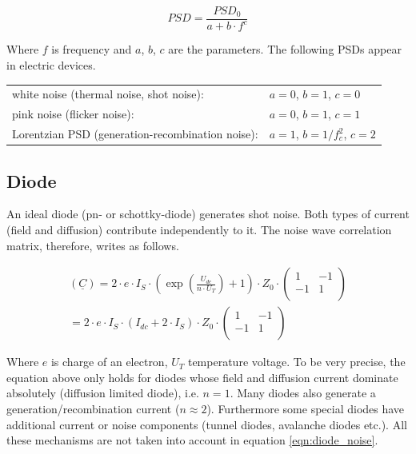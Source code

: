 \documentclass[10pt]{report}
\begin{document}
\begin{equation}
PSD = \frac{PSD_0}{a+b\cdot f^c}
\end{equation}

Where $f$ is frequency and $a$, $b$, $c$ are the parameters.  The
following PSDs appear in electric devices.

\addvspace{12pt}

\begin{tabular}{ll}
white noise (thermal noise, shot noise):         & $a=0$, $b=1$, $c=0$ \\
pink noise (flicker noise):                      & $a=0$, $b=1$, $c=1$ \\
Lorentzian PSD (generation-recombination noise): & $a=1$, $b=1/f_c^2$, $c=2$ \\
\end{tabular}


\subsection{Diode}

An ideal diode (pn- or schottky-diode) generates shot noise. Both types of current
(field and diffusion) contribute independently to it. The noise wave correlation
matrix, therefore, writes as follows.

\begin{equation}
\begin{split}
(\underline{C})
 = 2\cdot e\cdot I_S\cdot \left( \exp\left( \frac{U_{dc}}{n\cdot U_T} \right) +1 \right) \cdot Z_0\cdot\begin{pmatrix}
   1 & -1\\
  -1 &  1\\
\end{pmatrix} \\
 = 2\cdot e\cdot I_S\cdot (I_{dc}+2\cdot I_S)\cdot Z_0\cdot
\begin{pmatrix}
   1 & -1\\
  -1 &  1\\
\end{pmatrix}
\end{split}
\label{eqn:diode_noise}
\end{equation}

Where $e$ is charge of an electron, $U_T$ temperature voltage.  To be
very precise, the equation above only holds for diodes whose field and
diffusion current dominate absolutely (diffusion limited diode),
i.e. $n=1$.  Many diodes also generate a generation/recombination
current ($n\approx 2$).  Furthermore some special diodes have
additional current or noise components (tunnel diodes, avalanche
diodes etc.).  All these mechanisms are not taken into account in
equation \eqref{eqn:diode_noise}.
\end{document}

